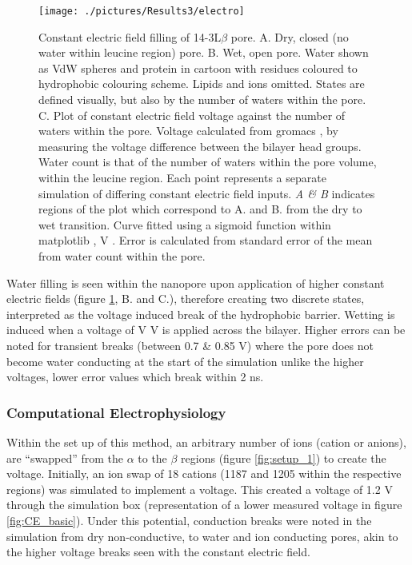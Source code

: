 \begin{figure}[H]
\begin{center}
\texttt{[image: ./pictures/Results3/electro]}
\caption[Constant electric field filling of 14-3L$\beta$ pore.] {Constant electric field filling of 14-3L$\beta$ pore. A. Dry, closed (no water within leucine region) pore. B. Wet, open pore. Water shown as VdW spheres and protein in cartoon with residues coloured to hydrophobic colouring scheme. Lipids and ions omitted. States are defined visually, but also by the number of waters within the pore. C. Plot of constant electric field voltage against the number of waters within the pore. Voltage calculated from gromacs \cite{VanderSpoel2013}, by measuring the voltage difference between the bilayer head groups. Water count is that of the number of waters within the pore volume, within the leucine region. Each point represents a separate simulation of differing constant electric field inputs. \textit{A \& B} indicates regions of the plot which correspond to A. and B. from the dry to wet transition. Curve fitted using a sigmoid function within matplotlib \cite{Hunter2007}, V\textsubscript{} . Error is calculated from standard error of the mean from water count within the pore.}
\label{fig:electro}
\end{center}
\end{figure}

Water filling is seen within the nanopore upon application of higher constant electric fields (figure \ref{fig:electro}, B. and C.), therefore creating two discrete states, interpreted as the voltage induced break of the hydrophobic barrier. Wetting is induced when a voltage of V\textsubscript{}  V is applied across the bilayer. Higher errors can be noted for transient breaks (between 0.7 \& 0.85 V) where the pore does not become water conducting at the start of the  simulation unlike the higher voltages, lower error values which break within 2 ns.

\subsubsection{Computational Electrophysiology}

Within the set up of this method, an arbitrary number of ions (cation or anions), are ``swapped'' from the $\alpha$ to the $\beta$ regions (figure \ref{fig:setup_1}) to create the voltage. Initially, an ion swap of 18 cations (1187 and 1205 within the respective regions) was simulated to implement a voltage. This created a voltage of 1.2 V through the simulation box (representation of a lower measured voltage in figure \ref{fig:CE_basic}). Under this potential, conduction breaks were noted in the simulation from dry non-conductive, to water and ion conducting pores, akin to the higher voltage breaks seen with the constant electric field.


